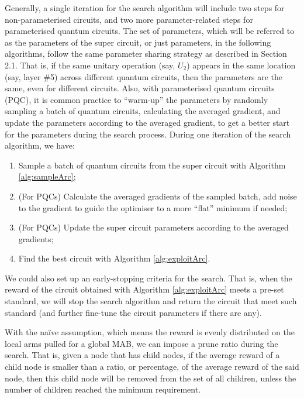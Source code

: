 \documentclass[a4paper,onecolumn,11pt]{quantumarticle}
\begin{document}
    
Generally, a single iteration for the search algorithm will include two steps for non-parameterised circuits, and two more parameter-related steps for parameterised quantum circuits. The set of parameters, which will be referred to as the parameters of the super circuit, or just parameters, in the following algorithms, follow the same parameter sharing strategy as described in Section 2.1. That is, if the same unitary operation (say, $U_2$) appears in the same location (say, layer \#5) across different quantum circuits, then the parameters are the same, even for different circuits. Also, with parameterised quantum circuits (PQC), it is common practice to ``warm-up'' the parameters by randomly sampling a batch of quantum circuits, calculating the averaged gradient, and update the parameters according to the averaged gradient, to get a better start for the parameters during the search process. During one iteration of the search algorithm, we have:
\begin{enumerate}
    \item Sample a batch of quantum circuits from the super circuit with Algorithm \ref{alg:sampleArc};
    \item (For PQCs) Calculate the averaged gradients of the sampled batch, add noise to the gradient to guide the optimiser to a more ``flat'' minimum if needed;
    \item (For PQCs) Update the super circuit parameters according to the averaged gradients;
    \item Find the best circuit with Algorithm \ref{alg:exploitArc}.
\end{enumerate}

We could also set up an early-stopping criteria for the search. That is, when the reward of the circuit obtained with Algorithm \ref{alg:exploitArc} meets a pre-set standard, we will stop the search algorithm and return the circuit that meet such standard (and further fine-tune the circuit parameters if there are any).

With the na\"ive assumption, which means the reward is evenly distributed on the local arms pulled for a global MAB, we can impose a prune ratio during the search. That is, given a node that has child nodes, if the average reward of a child node is smaller than a ratio, or percentage, of the average reward of the said node, then this child node will be removed from the set of all children, unless the number of children reached the minimum requirement.
\end{document}
